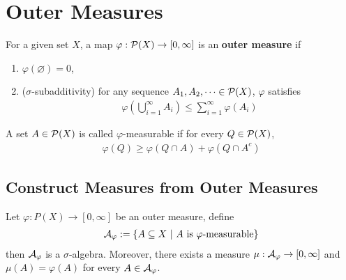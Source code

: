 \documentclass[11pt]{article}
\numberwithin{equation}{section}
\newcommand{\s}[0]{$\sigma$}
\begin{document}
    \section{Outer Measures}
    \begin{definition}
    	For a given set $X$, a map $\varphi: \mathcal{{P}}(X) \to [0, \infty]$ is an \textbf{outer measure} if
    	\begin{enumerate}
    		\item $\varphi(\varnothing) = 0$,
    		\item (\s-subadditivity) for any sequence $A_1, A_2, \cdots \in \mathcal{{P}}(X)$, $\varphi$ satisfies
    		\begin{align}
 				\varphi \left(\bigcup_{i=1}^\infty A_i \right) \leq \sum_{i=1}^\infty \varphi(A_i)
 			\end{align}
    	\end{enumerate}
    \end{definition}
    
    \begin{definition}
    	A set $A \in \mathcal{{P}}(X)$ is called $\varphi$-measurable if for every $Q \in \mathcal{{P}}(X)$,
    	\begin{align}
    		\varphi(Q) \geq \varphi(Q \cap A) + \varphi(Q \cap A^c)
    	\end{align}
    \end{definition}
    
    \subsection{Construct Measures from Outer Measures}
    
    \begin{proposition}
    	Let $\varphi: P(X) \to [0, \infty]$ be an outer measure, define
    	\begin{align}
    		\mathcal{{A}}_\varphi := \{ A \subseteq X\ |\ A \text{{ is $\varphi$-measurable}}\}
    	\end{align}
    	then $\mathcal{{A}}_\varphi$ is a \s-algebra.
    	Moreover, there exists a measure $\mu: \mathcal{{A}}_\varphi \to [0, \infty]$ and $\mu(A) = \varphi(A)$ for every $A \in \mathcal{{A}}_\varphi$. 
    \end{proposition}
\end{document}
